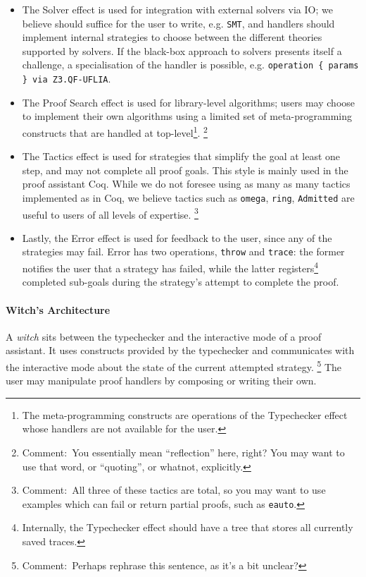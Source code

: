 \documentclass[sigconfl]{acmart}
\newcommand{\comment}[1]{\footnote{Comment:~#1}}
\begin{document}
\begin{itemize}
  \item The Solver effect is used for integration with external solvers via IO;
    we believe should suffice for the user to write, e.g. \texttt{SMT}, and handlers should
    implement internal strategies to choose between the different theories
    supported by solvers. If the black-box approach to solvers presents itself a
    challenge, a specialisation of the handler is possible, e.g.
    \texttt{operation \{ params \} via Z3.QF-UFLIA}.
  \item The Proof Search effect is used for library-level algorithms; users may
    choose to implement their own algorithms using a limited set of
    meta-programming constructs that are handled at top-level\footnote{The
      meta-programming constructs are operations of the Typechecker effect
      whose handlers are not available for the user.}.
    \comment{You essentially mean ``reflection'' here, right? You may want to
      use that word, or ``quoting'', or whatnot, explicitly.}
  \item The Tactics effect is used for strategies that simplify the goal at
    least one step, and may not complete all proof goals. This style is mainly
    used in the proof assistant Coq. While we do not foresee using as many as many
    tactics implemented as in Coq, we believe tactics such as
    \texttt{omega}, \texttt{ring}, \texttt{Admitted} are useful to users of
    all levels of expertise.
    \comment{All three of these tactics are total, so you may want to use
      examples which can fail or return partial proofs, such as \texttt{eauto}.}
  \item Lastly, the Error effect is used for feedback to the user,
    since any of the strategies may fail. Error has two operations,
    \texttt{throw} and \texttt{trace}: the former notifies the user that a strategy
    has failed, while the latter registers\footnote{Internally, the
      Typechecker effect should have a tree that stores all currently
      saved traces.} completed sub-goals during the
    strategy's attempt to complete the proof.
\end{itemize}

\paragraph{Witch's Architecture}
A \textit{witch} sits between the typechecker and the interactive mode of a
proof assistant. It uses constructs provided by the typechecker and communicates
with the interactive mode about the state of the current attempted strategy.
\comment{Perhaps rephrase this sentence, as it's a bit unclear?}
The user may manipulate proof handlers by composing or writing their own.
\end{document}
